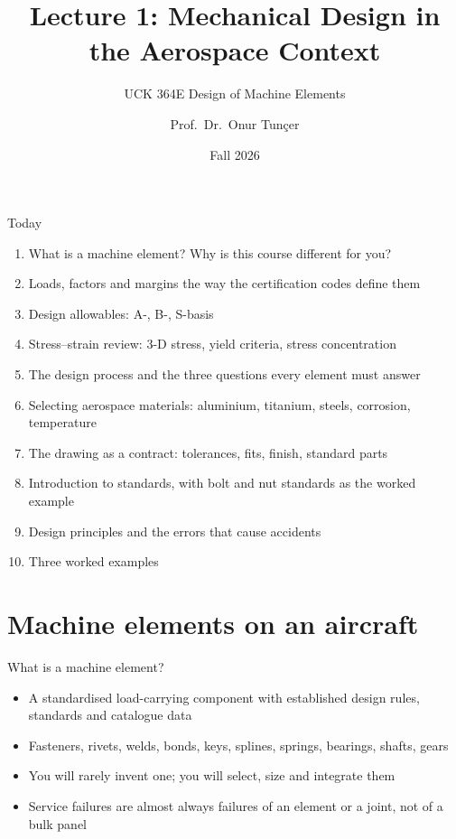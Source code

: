 \documentclass[aspectratio=169,10pt]{beamer}
\title{Lecture 1: Mechanical Design in the Aerospace Context}
\subtitle{UCK 364E Design of Machine Elements}
\author{Prof.\ Dr.\ Onur Tunçer}
\institute{Department of Aeronautical Engineering, Istanbul Technical University}
\date{Fall 2026}
\begin{document}
\maketitle

\begin{frame}{Today}
\begin{enumerate}
  \item What is a machine element? Why is this course different for you?
  \item Loads, factors and margins the way the certification codes define them
  \item Design allowables: A-, B-, S-basis
  \item Stress--strain review: 3-D stress, yield criteria, stress concentration
  \item The design process and the three questions every element must answer
  \item Selecting aerospace materials: aluminium, titanium, steels, corrosion, temperature
  \item The drawing as a contract: tolerances, fits, finish, standard parts
  \item Introduction to standards, with bolt and nut standards as the worked example
  \item Design principles and the errors that cause accidents
  \item Three worked examples
\end{enumerate}
\end{frame}

\section{Machine elements on an aircraft}

\begin{frame}{What is a machine element?}
\begin{itemize}
  \item A \alert{standardised load-carrying component} with established design rules, standards and catalogue data
  \item Fasteners, rivets, welds, bonds, keys, splines, springs, bearings, shafts, gears
  \item You will rarely invent one; you will \alert{select, size and integrate} them
  \item Service failures are almost always failures of an element or a joint, not of a bulk panel
\end{itemize}
\end{frame}
\end{document}
